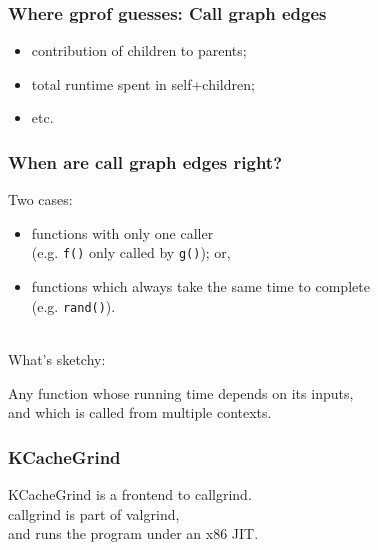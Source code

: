 \documentclass[aspectratio=43]{beamer}
\newenvironment{changemargin}[1]{%
  \begin{list}{}{%
    \setlength{\topsep}{0pt}%
    \setlength{\leftmargin}{#1}%
    \setlength{\rightmargin}{1em}
    \setlength{\listparindent}{\parindent}%
    \setlength{\itemindent}{\parindent}%
    \setlength{\parsep}{\parskip}%
  }%
  \item[]}{\end{list}}
\begin{document}
\begin{frame}
  \frametitle{Where gprof guesses: Call graph edges}
  \begin{changemargin}{2cm}
    \begin{itemize}
  \item contribution of children to parents;
  \item total runtime spent in self+children;
  \item etc.
    \end{itemize}
  \end{changemargin}
\end{frame}

\begin{frame}
  \frametitle{When are call graph edges right?}
  \begin{changemargin}{1.5cm}
    Two cases:
    \begin{itemize}
    \item functions with only one caller\\
      (e.g. {\tt f()} only called by {\tt g()}); or,
    \item functions which always take the same time to complete\\
      (e.g. {\tt rand()}).
    \end{itemize}
    ~\\
    What's sketchy:\\
    \begin{changemargin}{1em} Any function whose running time depends on its inputs,\\
    and which is called from multiple contexts.
    \end{changemargin}
  \end{changemargin}
\end{frame}

\begin{frame}
  \frametitle{KCacheGrind}
  \begin{changemargin}{2cm}
    KCacheGrind is a frontend to callgrind.\\[1em]
    callgrind is part of valgrind,\\
    and runs the program under an x86 JIT.
  \end{changemargin}
\end{frame}
\end{document}
